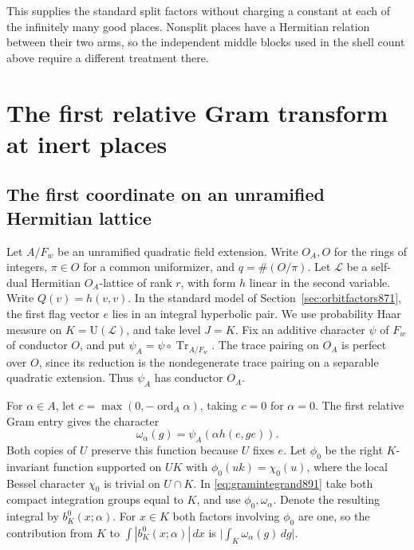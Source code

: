 \documentclass[a4paper,11pt]{article}
\theoremstyle{definition}
\theoremstyle{remark}
\numberwithin{equation}{section}
\begin{document}
This supplies the standard split factors without charging a
constant at each of the infinitely many good places. Nonsplit
places have a Hermitian relation between their two arms, so the
independent middle blocks used in the shell count above require
a different treatment there.
\clearpage

\section{The first relative Gram transform at inert places}\label{nav:inert-gram-transforms}

\subsection{The first coordinate on an unramified Hermitian lattice}
\label{sec:hermitiancone900}

Let \(A/F_w\) be an unramified quadratic field extension. Write
\(O_A,O\) for the rings of integers, \(\pi\in O\) for a common
uniformizer, and \(q=\#(O/\pi)\). Let \(\mathcal L\) be a self-dual
Hermitian \(O_A\)-lattice of rank \(r\), with form \(h\) linear in
the second variable. Write \(Q(v)=h(v,v)\). In the standard model
of Section~\ref{sec:orbitfactors871}, the first flag vector \(e\)
lies in an integral hyperbolic pair. We use probability Haar measure
on \(K=\mathrm U(\mathcal L)\), and take level \(J=K\). Fix an
additive character \(\psi\) of \(F_w\) of conductor \(O\), and put
\(\psi_A=\psi\circ\operatorname{Tr}_{A/F_w}\). The trace pairing
on \(O_A\) is perfect over \(O\), since its reduction is the
nondegenerate trace pairing on a separable quadratic extension.
Thus \(\psi_A\) has conductor \(O_A\).

For \(\alpha\in A\), let \(c=\max(0,-\operatorname{ord}_A\alpha)\),
taking \(c=0\) for \(\alpha=0\). The first relative Gram entry gives
the character
\[
                    \omega_\alpha(g)=\psi_A(\alpha h(e,ge)).
\]
Both copies of \(U\) preserve this function because \(U\) fixes \(e\).
Let \(\phi_0\) be the right \(K\)-invariant function supported on
\(UK\) with \(\phi_0(uk)=\chi_0(u)\), where the local Bessel
character \(\chi_0\) is trivial on \(U\cap K\).
In \eqref{eq:gramintegrand891} take both compact integration
groups equal to \(K\), and use \(\phi_0,\omega_\alpha\).
Denote the resulting integral by \(b^0_K(x;\alpha)\).
For \(x\in K\) both factors involving \(\phi_0\) are one, so the
contribution from \(K\) to \(\int |b^0_K(x;\alpha)|\,dx\) is
\(\big|\int_K\omega_\alpha(g)\,dg\big|\).
\end{document}
